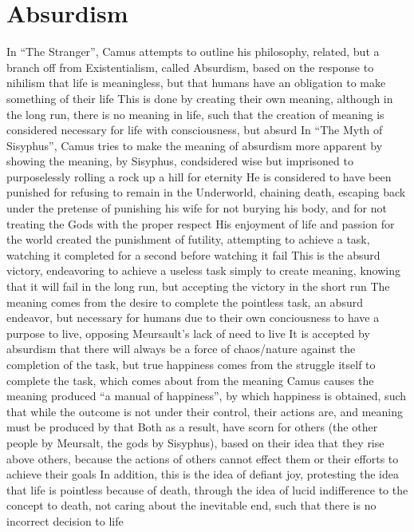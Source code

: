 \documentclass[11 pt, twoside]{article}
\newenvironment{outline*}
{
	\begin{outline}[enumerate]
	}
	{\end{outline}
}
\begin{document}
\section{Absurdism}
\begin{outline*}
\1 In ``The Stranger'', Camus attempts to outline his philosophy, related, but a branch off from Existentialism, called Absurdism, based on the response to nihilism that life is meaningless, but that humans have an obligation to make something of their life
\2 This is done by creating their own meaning, although in the long run, there is no meaning in life, such that the creation of meaning is considered necessary for life with consciousness, but absurd
\1 In ``The Myth of Sisyphus'', Camus tries to make the meaning of absurdism more apparent by showing the meaning, by Sisyphus, condsidered wise but imprisoned to purposelessly rolling a rock up a hill for eternity
\2 He is considered to have been punished for refusing to remain in the Underworld, chaining death, escaping back under the pretense of punishing his wife for not burying his body, and for not treating the Gods with the proper respect
\2 His enjoyment of life and passion for the world created the punishment of futility, attempting to achieve a task, watching it completed for a second before watching it fail
\3 This is the absurd victory, endeavoring to achieve a useless task simply to create meaning, knowing that it will fail in the long run, but accepting the victory in the short run
\2 The meaning comes from the desire to complete the pointless task, an absurd endeavor, but necessary for humans due to their own conciousness to have a purpose to live, opposing Meursault's lack of need to live
\3 It is accepted by absurdism that there will always be a force of chaos/nature against the completion of the task, but true happiness comes from the struggle itself to complete the task, which comes about from the meaning
\3 Camus causes the meaning produced ``a manual of happiness'', by which happiness is obtained, such that while the outcome is not under their control, their actions are, and meaning must be produced by that
\3 Both as a result, have scorn for others (the other people by Meursalt, the gods by Sisyphus), based on their idea that they rise above others, because the actions of others cannot effect them or their efforts to achieve their goals
\2 In addition, this is the idea of defiant joy, protesting the idea that life is pointless because of death, through the idea of lucid indifference to the concept to death, not caring about the inevitable end, such that there is no incorrect decision to life

\end{outline*}
\end{document}

